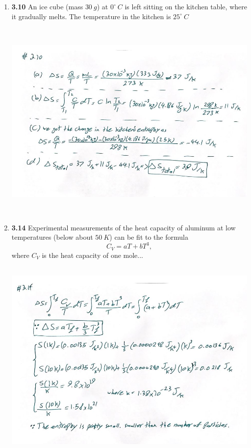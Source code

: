 \documentclass[fleqn]{article}
\begin{document}
\begin{enumerate}
    \pagebreak

    \item \textbf{3.10} An ice cube (mass $30 ~ g$) at $0^{\circ} ~ C$ is left sitting on the kitchen table,
    where it gradually melts. The temperature in the kitchen is $25^{\circ} ~ C$

      \begin{center}
        \includegraphics[height=10cm, width=14cm]{5.JPG}
      \end{center}

    \pagebreak

    \item \textbf{3.14} Experimental measurements of the heat capacity of aluminum at low temperatures 
    (below about $50 ~ K$) can be fit to the formula
    $$
      C_V=aT+bT^3,
    $$ where $C_V$ is the heat capacity of one mole...

      \begin{center}
        \includegraphics[height=10cm, width=14cm]{6.JPG}
      \end{center}


\end{enumerate}
\end{document}
